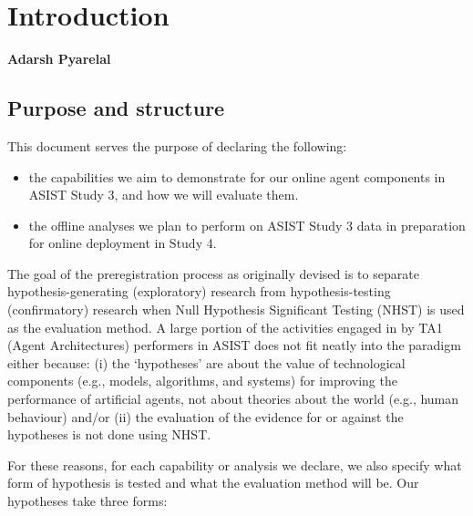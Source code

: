 \chapter{Introduction}
\textbf{Adarsh Pyarelal}

\section{Purpose and structure}

This document serves the purpose of declaring the following:

\begin{itemize}
    \item the capabilities we aim to demonstrate for our online agent
        components in ASIST Study 3, and how we will evaluate them.
    \item the offline analyses we plan to perform on ASIST Study 3 data
        in preparation for online deployment in Study 4.
\end{itemize}


The goal of the preregistration process as originally devised
\citep{Nosek.ea:2018} is to separate hypothesis-generating (exploratory)
research from hypothesis-testing (confirmatory) research when Null Hypothesis
Significant Testing (NHST) is used as the evaluation method. A large portion of
the activities engaged in by TA1 (Agent Architectures) performers in ASIST does
not fit neatly into the paradigm either because: (i) the `hypotheses' are about
the value of technological components (e.g., models, algorithms, and systems)
for improving the performance of artificial agents, not about theories about
the world (e.g., human behaviour) and/or (ii) the evaluation of the evidence
for or against the hypotheses is not done using NHST.

For these reasons, for each capability or analysis we declare, we also specify
what form of hypothesis is tested and what the evaluation method will be. Our
hypotheses take three forms:

